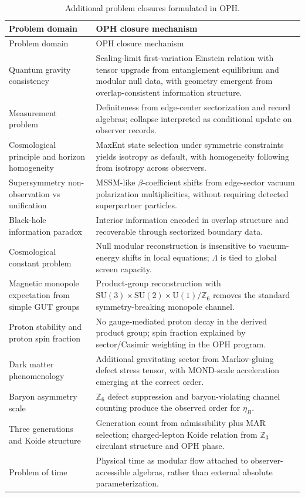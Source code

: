\documentclass[11pt]{article}
\newcommand{\SU}{\mathrm{SU}}
\newcommand{\U}{\mathrm{U}}
\begin{document}
\begin{longtable}{p{} p{}}
\caption{Additional problem closures formulated in OPH.}\label{tab:additional-closures}\\
\toprule
Problem domain & OPH closure mechanism \\
\midrule
\endfirsthead
\toprule
Problem domain & OPH closure mechanism \\
\midrule
\endhead
\bottomrule
\endfoot
Quantum gravity consistency & Scaling-limit first-variation Einstein relation with tensor upgrade from entanglement equilibrium and modular null data, with geometry emergent from overlap-consistent information structure. \\
Measurement problem & Definiteness from edge-center sectorization and record algebras; collapse interpreted as conditional update on observer records. \\
Cosmological principle and horizon homogeneity & MaxEnt state selection under symmetric constraints yields isotropy as default, with homogeneity following from isotropy across observers. \\
Supersymmetry non-observation vs unification & MSSM-like $\beta$-coefficient shifts from edge-sector vacuum polarization multiplicities, without requiring detected superpartner particles. \\
Black-hole information paradox & Interior information encoded in overlap structure and recoverable through sectorized boundary data. \\
Cosmological constant problem & Null modular reconstruction is insensitive to vacuum-energy shifts in local equations; $\Lambda$ is tied to global screen capacity. \\
Magnetic monopole expectation from simple GUT groups & Product-group reconstruction with $\SU(3)\times\SU(2)\times\U(1)/\mathbb{Z}_6$ removes the standard symmetry-breaking monopole channel. \\
Proton stability and proton spin fraction & No gauge-mediated proton decay in the derived product group; spin fraction explained by sector/Casimir weighting in the OPH program. \\
Dark matter phenomenology & Additional gravitating sector from Markov-gluing defect stress tensor, with MOND-scale acceleration emerging at the correct order. \\
Baryon asymmetry scale & $\mathbb{Z}_6$ defect suppression and baryon-violating channel counting produce the observed order for $\eta_B$. \\
Three generations and Koide structure & Generation count from admissibility plus MAR selection; charged-lepton Koide relation from $\mathbb{Z}_3$ circulant structure and OPH phase. \\
Problem of time & Physical time as modular flow attached to observer-accessible algebras, rather than external absolute parameterization. \\
\end{longtable}
\end{document}
